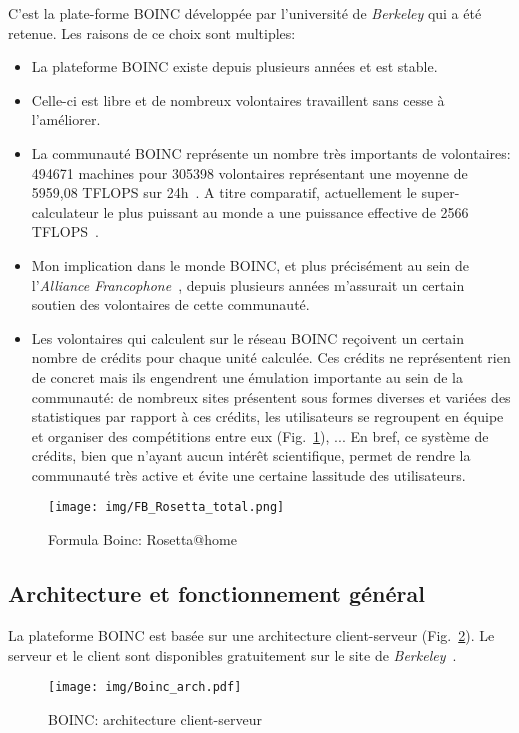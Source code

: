 \documentclass[a4paper, 11pt]{report}
\begin{document}
C'est la plate-forme \textsc{BOINC} développée par l'université de \textit{Berkeley} qui a été retenue. Les raisons de ce choix sont multiples:
\begin{itemize}
\item La plateforme \textsc{BOINC} existe depuis plusieurs années et est stable.
\item Celle-ci est libre et de nombreux volontaires travaillent sans cesse à l'améliorer.
\item La communauté \textsc{BOINC} représente un nombre très importants de volontaires: 494671 machines pour 305398 volontaires représentant une moyenne de 5959,08 TFLOPS sur 24h~\cite{BOINC}. A titre comparatif, actuellement le super-calculateur le plus puissant au monde a une puissance effective de 2566 TFLOPS~\cite{TOP500}.
\item Mon implication dans le monde \textsc{BOINC}, et plus précisément au sein de l'\textit{Alliance Francophone}~\cite{AF}, depuis plusieurs années m'assurait un certain soutien des volontaires de cette communauté.
\item Les volontaires qui calculent sur le réseau \textsc{BOINC} reçoivent un certain nombre de crédits pour chaque unité calculée. Ces crédits ne représentent rien de concret mais ils engendrent une émulation importante au sein de la communauté: de nombreux sites présentent sous formes diverses et variées des statistiques par rapport à ces crédits, les utilisateurs se regroupent en équipe et organiser des compétitions entre eux (Fig.~\ref{fb}), ... En bref, ce système de crédits, bien que n'ayant aucun intérêt scientifique, permet de rendre la communauté très active et évite une certaine lassitude des utilisateurs.\label{credits}
\end{itemize}

\begin{figure}[!h]
\centering
\texttt{[image: img/FB\_Rosetta\_total.png]}
\caption{Formula Boinc: Rosetta@home~\cite{SEB}}
\label{fb}
\end{figure}


\subsection{Architecture et fonctionnement général}
La plateforme \textsc{BOINC} est basée sur une architecture client-serveur (Fig.~\ref{clientserveur}). Le serveur et le client sont disponibles gratuitement sur le site de \textit{Berkeley}~\cite{BOINC}.
\begin{figure}[!h]
\centering
\texttt{[image: img/Boinc\_arch.pdf]}
\caption{\textsc{BOINC}: architecture client-serveur}
\label{clientserveur}
\end{figure}
\end{document}
